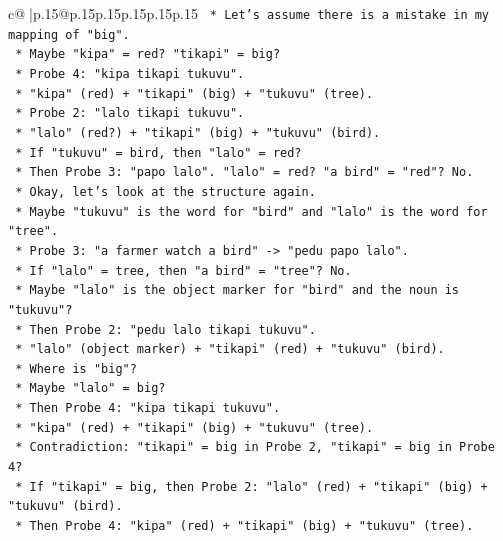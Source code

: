 \documentclass{article}
\begin{document}
{\begin{supertabular}{c@{$\;$}|p{.15\linewidth}@{}p{.15\linewidth}p{.15\linewidth}p{.15\linewidth}p{.15\linewidth}p{.15\linewidth}}
{{{\texttt{                *   Let's assume there is a mistake in my mapping of "big".} \\
\texttt{                *   Maybe "kipa" = red? "tikapi" = big?} \\
\texttt{                *   Probe 4: "kipa tikapi tukuvu".} \\
\texttt{                    *   "kipa" (red) + "tikapi" (big) + "tukuvu" (tree).} \\
\texttt{                *   Probe 2: "lalo tikapi tukuvu".} \\
\texttt{                    *   "lalo" (red?) + "tikapi" (big) + "tukuvu" (bird).} \\
\texttt{                    *   If "tukuvu" = bird, then "lalo" = red?} \\
\texttt{                    *   Then Probe 3: "papo lalo". "lalo" = red? "a bird" = "red"? No.} \\
\texttt{                *   Okay, let's look at the structure again.} \\
\texttt{                *   Maybe "tukuvu" is the word for "bird" and "lalo" is the word for "tree".} \\
\texttt{                *   Probe 3: "a farmer watch a bird" {-}> "pedu papo lalo".} \\
\texttt{                    *   If "lalo" = tree, then "a bird" = "tree"? No.} \\
\texttt{                *   Maybe "lalo" is the object marker for "bird" and the noun is "tukuvu"?} \\
\texttt{                *   Then Probe 2: "pedu lalo tikapi tukuvu".} \\
\texttt{                    *   "lalo" (object marker) + "tikapi" (red) + "tukuvu" (bird).} \\
\texttt{                    *   Where is "big"?} \\
\texttt{                    *   Maybe "lalo" = big?} \\
\texttt{                    *   Then Probe 4: "kipa tikapi tukuvu".} \\
\texttt{                    *   "kipa" (red) + "tikapi" (big) + "tukuvu" (tree).} \\
\texttt{                    *   Contradiction: "tikapi" = big in Probe 2, "tikapi" = big in Probe 4?} \\
\texttt{                    *   If "tikapi" = big, then Probe 2: "lalo" (red) + "tikapi" (big) + "tukuvu" (bird).} \\
\texttt{                    *   Then Probe 4: "kipa" (red) + "tikapi" (big) + "tukuvu" (tree).} \\
}}}
\end{supertabular}}
\end{document}
